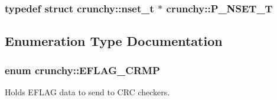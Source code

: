 \subsubsection[{P\+\_\+\+N\+S\+E\+T\+\_\+\+T}]{\setlength{\rightskip}{0pt plus 5cm}typedef struct {\bf crunchy\+::nset\+\_\+t} $\ast$ {\bf crunchy\+::\+P\+\_\+\+N\+S\+E\+T\+\_\+\+T}}\label{namespacecrunchy_ab958409ccb75be47eba557824d83fb0e}


\subsection{Enumeration Type Documentation}
\hypertarget{namespacecrunchy_acc00ed7986064df9b2232c76a22709c4}{}
\subsubsection[{E\+F\+L\+A\+G\+\_\+\+C\+R\+M\+P}]{\setlength{\rightskip}{0pt plus 5cm}enum {\bf crunchy\+::\+E\+F\+L\+A\+G\+\_\+\+C\+R\+M\+P}}\label{namespacecrunchy_acc00ed7986064df9b2232c76a22709c4}


Holds E\+F\+L\+A\+G data to send to C\+R\+C checkers. 


